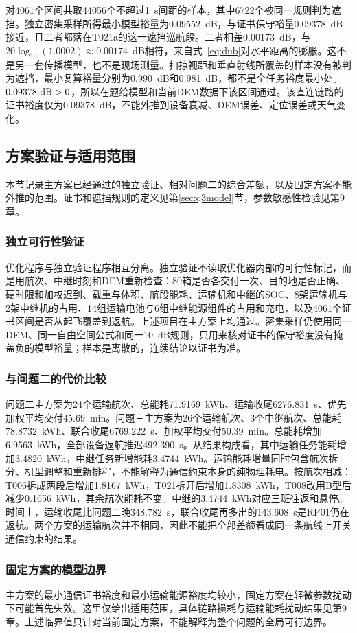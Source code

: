 对4061个区间共取44056个不超过1~s间距的样本，其中6722个被同一规则判为遮挡。独立密集采样所得最小模型裕量为0.09552~dB，与证书保守裕量0.09378~dB接近，且二者都落在T021a的这一遮挡巡航段。二者相差0.00173~dB，与$20\log_{10}(1.0002)\approx0.00174$~dB相符，来自式~\eqref{eq:dub}对水平距离的膨胀。这不是另一套传播模型，也不是现场测量。扫掠视距和垂直射线所覆盖的样本没有被判为遮挡，最小复算裕量分别为0.990~dB和0.981~dB，都不是全任务裕度最小处。$0.09378~{\rm dB}>0$，所以在题给模型和当前DEM数据下该区间通过。该直连链路的证书裕度仅为0.09378~dB，不能外推到设备衰减、DEM误差、定位误差或天气变化。

\subsection{方案验证与适用范围}

本节记录主方案已经通过的独立验证、相对问题二的综合差额，以及固定方案不能外推的范围。证书和遮挡规则的定义见第\ref{sec:q3model}节，参数敏感性检验见第9章。

\subsubsection{独立可行性验证}

优化程序与独立验证程序相互分离。独立验证不读取优化器内部的可行性标记，而是用航次、中继时刻和DEM重新检查：80箱是否各交付一次、目的地是否正确、硬时限和加权迟到、载重与体积、航段能耗、运输机和中继的SOC、8架运输机与2架中继机的占用、14组运输电池与6组中继能源组件的占用和充电，以及4061个证书区间是否从起飞覆盖到返航。上述项目在主方案上均通过。密集采样仍使用同一DEM、同一自由空间公式和同一10~dB规则，只用来核对证书的保守裕度没有掩盖负的模型裕量；样本是离散的，连续结论以证书为准。

\subsubsection{与问题二的代价比较}

问题二主方案为24个运输航次、总能耗71.9169~kWh、运输收尾6276.831~s、优先加权平均交付45.69~min。问题三主方案为26个运输航次、3个中继航次、总能耗78.8732~kWh、联合收尾6769.222~s、加权平均交付50.39~min。总能耗增加6.9563~kWh，全部设备返航推迟492.390~s。从结果构成看，其中运输任务能耗增加3.4820~kWh，中继任务新增能耗3.4744~kWh。运输能耗增量同时包含航次拆分、机型调整和重新排程，不能解释为通信约束本身的纯物理耗电。按航次相减：T006拆成两段后增加1.8167~kWh，T021拆开后增加1.8308~kWh，T008改用B型后减少0.1656~kWh，其余航次能耗不变。中继的3.4744~kWh对应三班往返和悬停。时间上，运输收尾比问题二晚348.782~s，联合收尾再多出的143.608~s是RP01仍在返航。两个方案的运输航次并不相同，因此不能把全部差额看成同一条航线上开关通信约束的结果。

\subsubsection{固定方案的模型边界}

主方案的最小通信证书裕度和最小运输能源裕度均较小，固定方案在轻微参数扰动下可能首先失效。这里仅给出适用范围，具体链路损耗与运输能耗扰动结果见第9章。上述临界值只针对当前固定方案，不能解释为整个问题的全局可行边界。
